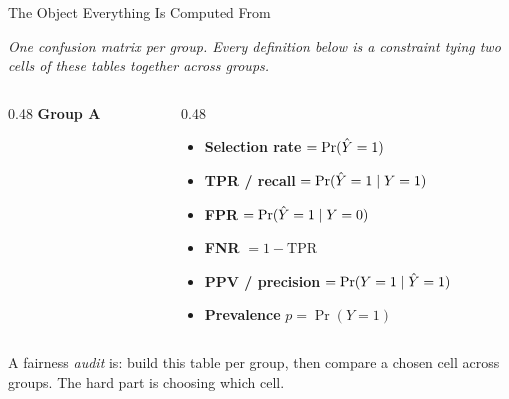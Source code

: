 
\begin{frame}{The Object Everything Is Computed From}

    \centering
    \textit{One confusion matrix per group. Every definition below is a constraint tying two cells
    of these tables together across groups.}

    \vspace{0.6em}

    \begin{columns}[c]
        \begin{column}{0.48\textwidth}
            \centering \textbf{Group A}
        \end{column}
        \begin{column}{0.48\textwidth}
            \small
            \begin{itemize}
                \setlength\itemsep{0.45em}
                \item \textbf{Selection rate} $= \Pr(\hat{Y} = 1)$
                \item \textbf{TPR / recall} $= \Pr(\hat{Y}=1 \mid Y=1)$
                \item \textbf{FPR} $= \Pr(\hat{Y}=1 \mid Y=0)$
                \item \textbf{FNR} $= 1 - \text{TPR}$
                \item \textbf{PPV / precision} $= \Pr(Y=1 \mid \hat{Y}=1)$
                \item \textbf{Prevalence} $p = \Pr(Y=1)$
            \end{itemize}
        \end{column}
    \end{columns}

    \vspace{0.8em}
    \begin{block}{}
        \centering
        \small A fairness \emph{audit} is: build this table per group, then compare a chosen cell
        across groups. The hard part is choosing which cell.
    \end{block}
\end{frame}
